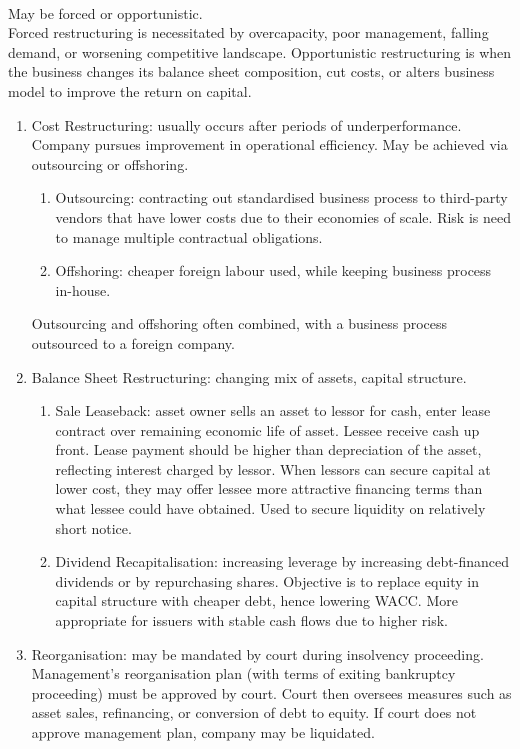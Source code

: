 \begin{remark} \\
May be forced or opportunistic.\\
Forced restructuring is necessitated by overcapacity, poor management, falling demand, or worsening competitive landscape. Opportunistic restructuring is when the business changes its balance sheet composition, cut costs, or alters business model to improve the return on capital.
\begin{enumerate}[label=\roman*.]
\setlength{\itemsep}{0pt}
\item Cost Restructuring: usually occurs after periods of underperformance. Company pursues improvement in operational efficiency. May be achieved via outsourcing or offshoring.
\begin{enumerate}[label=\arabic*.]
\setlength{\itemsep}{0pt}
\item Outsourcing: contracting out standardised business process to third-party vendors that have lower costs due to their economies of scale. Risk is need to manage multiple contractual obligations.
\item Offshoring: cheaper foreign labour used, while keeping business process in-house.
\end{enumerate}
Outsourcing and offshoring often combined, with a business process outsourced to a foreign company.
\item Balance Sheet Restructuring: changing mix of assets, capital structure.
\begin{enumerate}[label=\arabic*.]
\setlength{\itemsep}{0pt}
\item Sale Leaseback: asset owner sells an asset to lessor for cash, enter lease contract over remaining economic life of asset. Lessee receive cash up front. Lease payment should be higher than depreciation of the asset, reflecting interest charged by lessor. When lessors can secure capital at lower cost, they may offer lessee more attractive financing terms than what lessee could have obtained. Used to secure liquidity on relatively short notice.
\item Dividend Recapitalisation: increasing leverage by increasing debt-financed dividends or by repurchasing shares. Objective is to replace equity in capital structure with cheaper debt, hence lowering WACC. More appropriate for issuers with stable cash flows due to higher risk.
\end{enumerate}
\item Reorganisation: may be mandated by court during insolvency proceeding. Management's reorganisation plan (with terms of exiting bankruptcy proceeding) must be approved by court. Court then oversees measures such as asset sales, refinancing, or conversion of debt to equity. If court does not approve management plan, company may be liquidated.
\end{enumerate}
\end{remark}

